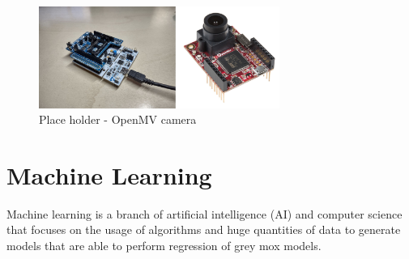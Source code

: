 \documentclass[12pt]{report}
\begin{document}
%
\begin{figure}[h!]
    \centering
    \includegraphics[width=0.7\textwidth]{Figures/Chapter2/hardware.jpg} 
    \caption{Place holder - OpenMV camera}
    \label{fig:hardware_openmv}    
\end{figure}
%




\chapter{Machine Learning}

Machine learning is a branch of artificial intelligence (AI) and computer science that focuses on the usage of algorithms and huge quantities of data to generate models that are able to perform regression of grey mox models. 
\end{document}
